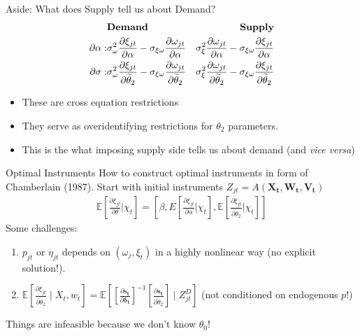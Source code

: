 \begin{frame}{Aside: What does Supply tell us about Demand?}
\begin{align*}
& \textbf{Demand} & \textbf{Supply} \\
\partial \alpha:& 
        \sigma_\omega^2 \frac{\partial \xi_{jt}}{\partial \alpha} - 
        \sigma_{\xi\omega}\frac{\partial \omega_{jt}}{\partial \alpha} 
        & \sigma_{\xi}^2 \frac{\partial \omega_{jt}}{\partial \alpha}  - 
        \sigma_{\xi\omega}\frac{\partial \xi_{jt}}{\partial \alpha}  \\
\partial \sigma:& 
        \sigma_\omega^2 \frac{\partial \xi_{jt}}{\partial \widetilde{\theta}_2}  -
        \sigma_{\xi\omega}\frac{\partial \omega_{jt}}{\partial \widetilde{\theta}_2} 
        & \sigma_{\xi}^2 \frac{\partial \omega_{jt}}{\partial \widetilde{\theta}_2} - 
        \sigma_{\xi\omega}\frac{\partial \xi_{jt}}{\partial \widetilde{\theta}_2}
\end{align*}
\begin{itemize}
\item These are \alert{cross equation restrictions}
\item They serve as \alert{overidentifying restrictions} for $\theta_2$ parameters.
\item This is the what imposing supply side tells us about demand (and \textit{vice versa})
\end{itemize}
\end{frame}


\begin{frame}{Optimal Instruments}
How to construct optimal instruments in form of Chamberlain (1987). Start with initial instruments $Z_{jt}=A\left(\symbf{X_t},\symbf{W_t},\symbf{V_t}\right)$
\begin{eqnarray*}
\mathbb{E}\left[\frac{\partial \xi_{jt}}{\partial \theta} | \chi_{t} \right] = \left[\beta, E\left[\frac{\partial \xi_{jt}}{\partial \alpha} | \chi_{t} \right] ,
 \mathbb{E}\left[\frac{\partial \xi_{jt}}{\partial \widetilde{\theta}_2} | \chi_{t} \right] \right]
\end{eqnarray*}
Some challenges:
\begin{enumerate}
\item $p_{jt}$ or $\eta_{jt}$ depends on $(\omega_{j},\xi_{t})$ in a highly nonlinear way (no explicit solution!).
\item $\mathbb{E}\left[\frac{\partial \xi_{jt}}{\partial \widetilde{\theta}_2} \mid X_t, w_{t} \right] =\mathbb{E}\left[\left[\frac{\partial \symbf{s_t}}{\partial \symbf{\delta_t}}\right]^{-1} 
\left[\frac{\partial \symbf{s_t}}{\partial \widetilde{\theta}_2}\right] \mid Z_{jt}^D \right]$  (not conditioned on endogenous $p$!)
\end{enumerate}
Things are \alert{infeasible} because we don't know $\theta_0$!
\end{frame}


